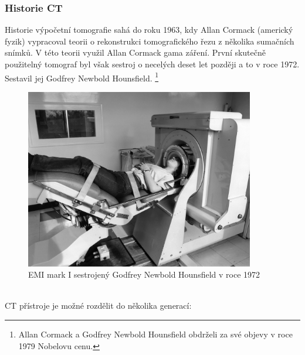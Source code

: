\documentclass{thesis}%
\begin{document}
\subsubsection{Historie CT}
Historie výpočetní tomografie sahá do roku 1963, kdy Allan Cormack (americký fyzik) vypracoval teorii o rekonstrukci tomografického řezu z několika sumačních snímků. V této teorii využil Allan Cormack gama záření. První skutečně použitelný tomograf byl však sestroj o necelých deset let později a to v roce 1972. Sestavil jej Godfrey Newbold Hounsfield. \footnote[2]{Allan Cormack a  Godfrey Newbold Hounsfield obdrželi za své objevy v roce 1979 Nobelovu cenu.} \\
\begin{figure}[h]
 \centering
	\includegraphics[width=10cm]{EMI_CT.png}
	\caption[EMI mark I]{EMI mark I sestrojený Godfrey Newbold Hounsfield v roce 1972}
\end{figure}
\null\\
CT přístroje je možné rozdělit do několika generací:
\end{document}
